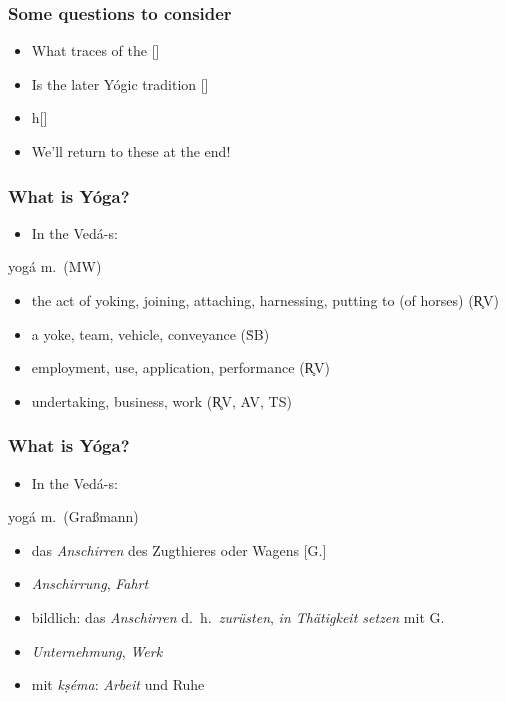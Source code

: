 \documentclass[pdf]{beamer}
\begin{document}
\begin{frame}[label=questions] \frametitle{Some questions to consider}
\begin{itemize}
	\item What traces of the []
	\item Is the later Yógic tradition []
	\item h[]
	\item We'll return to these at the end!
\end{itemize}
\end{frame}

\begin{frame} \frametitle{What is Yóga?}
\begin{itemize}
	\item In the Vedá-s:
\end{itemize}
 
\begin{block} {yogá m.~(MW)}
\begin{itemize}
	\item the act of yoking, joining, attaching, harnessing, putting to (of horses) (R̥V)
	\item a yoke, team, vehicle, conveyance (ṠB)
	\item employment, use, application, performance (R̥V)
	\item undertaking, business, work (R̥V, AV, TS)
\end{itemize}
\end{block}
\end{frame}

\begin{frame} \frametitle{What is Yóga?}
\begin{itemize}
	\item In the Vedá-s:
\end{itemize}

\begin{block} {yogá m.~(Graßmann)}
\begin{itemize}
	\item das \emph{Anschirren} des Zugthieres oder Wagens [G.]
	\item \emph{Anschirrung}, \emph{Fahrt}
	\item bildlich: das \emph{Anschirren} d.~h.~\emph{zurüsten}, \emph{in Thätigkeit setzen} mit G.
	\item \emph{Unternehmung}, \emph{Werk}
	\item mit \textit{kṣéma}: \emph{Arbeit} und Ruhe
\end{itemize}
\end{block}
\end{frame}
\end{document}
